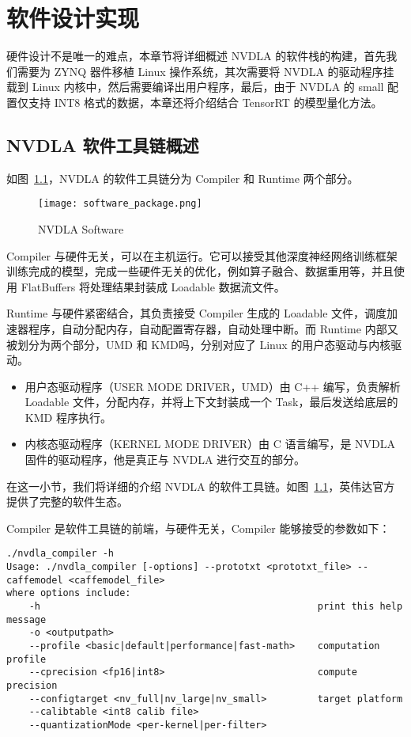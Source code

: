 \chapter{软件设计实现}\label{chap:software}

硬件设计不是唯一的难点，本章节将详细概述 NVDLA 的软件栈的构建，首先我们需要为 ZYNQ 器件移植 Linux 操作系统，其次需要将 NVDLA 的驱动程序挂载到 Linux 内核中，然后需要编译出用户程序，最后，由于 NVDLA 的 small 配置仅支持 INT8 格式的数据，本章还将介绍结合 TensorRT 的模型量化方法。

\section{NVDLA 软件工具链概述}

如图~\ref{fig:NVDLA Software}，NVDLA 的软件工具链分为 Compiler 和 Runtime 两个部分。

\begin{figure}[!htbp]
    \centering
    \texttt{[image: software\_package.png]}
    \caption{NVDLA Software}
    \label{fig:NVDLA Software}
\end{figure}

Compiler 与硬件无关，可以在主机运行。它可以接受其他深度神经网络训练框架训练完成的模型，完成一些硬件无关的优化，例如算子融合、数据重用等，并且使用 FlatBuffers 将处理结果封装成 Loadable 数据流文件。

Runtime 与硬件紧密结合，其负责接受 Compiler 生成的 Loadable 文件，调度加速器程序，自动分配内存，自动配置寄存器，自动处理中断。而 Runtime 内部又被划分为两个部分，UMD 和 KMD吗，分别对应了 Linux 的用户态驱动与内核驱动。

\begin{itemize}
    \item 用户态驱动程序（USER MODE DRIVER，UMD）由 C++ 编写，负责解析 Loadable 文件，分配内存，并将上下文封装成一个 Task，最后发送给底层的 KMD 程序执行。
    \item 内核态驱动程序（KERNEL MODE DRIVER）由 C 语言编写，是 NVDLA 固件的驱动程序，他是真正与 NVDLA 进行交互的部分。
\end{itemize}

在这一小节，我们将详细的介绍 NVDLA 的软件工具链。如图~\ref{fig:NVDLA Software}，英伟达官方提供了完整的软件生态。


Compiler 是软件工具链的前端，与硬件无关，Compiler 能够接受的参数如下：

\begin{lstlisting}
./nvdla_compiler -h
Usage: ./nvdla_compiler [-options] --prototxt <prototxt_file> --caffemodel <caffemodel_file>
where options include:
    -h                                                 print this help message
    -o <outputpath>                                    
    --profile <basic|default|performance|fast-math>    computation profile
    --cprecision <fp16|int8>                           compute precision
    --configtarget <nv_full|nv_large|nv_small>         target platform
    --calibtable <int8 calib file>                     
    --quantizationMode <per-kernel|per-filter>         
\end{lstlisting}

